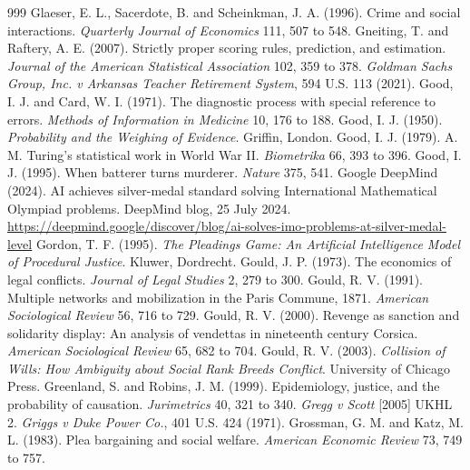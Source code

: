 \begin{thebibliography}{999}
 Glaeser, E. L., Sacerdote, B. and Scheinkman, J. A. (1996). Crime and social interactions. \emph{Quarterly Journal of Economics} 111, 507 to 548.
 Gneiting, T. and Raftery, A. E. (2007). Strictly proper scoring rules, prediction, and estimation. \emph{Journal of the American Statistical Association} 102, 359 to 378.
 \emph{Goldman Sachs Group, Inc. v Arkansas Teacher Retirement System}, 594 U.S. 113 (2021).
 Good, I. J. and Card, W. I. (1971). The diagnostic process with special reference to errors. \emph{Methods of Information in Medicine} 10, 176 to 188.
 Good, I. J. (1950). \emph{Probability and the Weighing of Evidence}. Griffin, London.
 Good, I. J. (1979). A. M. Turing's statistical work in World War II. \emph{Biometrika} 66, 393 to 396.
 Good, I. J. (1995). When batterer turns murderer. \emph{Nature} 375, 541.
 Google DeepMind (2024). AI achieves silver-medal standard solving International Mathematical Olympiad problems. DeepMind blog, 25 July 2024. \url{https://deepmind.google/discover/blog/ai-solves-imo-problems-at-silver-medal-level}
 Gordon, T. F. (1995). \emph{The Pleadings Game: An Artificial Intelligence Model of Procedural Justice}. Kluwer, Dordrecht.
 Gould, J. P. (1973). The economics of legal conflicts. \emph{Journal of Legal Studies} 2, 279 to 300.
 Gould, R. V. (1991). Multiple networks and mobilization in the Paris Commune, 1871. \emph{American Sociological Review} 56, 716 to 729.
 Gould, R. V. (2000). Revenge as sanction and solidarity display: An analysis of vendettas in nineteenth century Corsica. \emph{American Sociological Review} 65, 682 to 704.
 Gould, R. V. (2003). \emph{Collision of Wills: How Ambiguity about Social Rank Breeds Conflict}. University of Chicago Press.
 Greenland, S. and Robins, J. M. (1999). Epidemiology, justice, and the probability of causation. \emph{Jurimetrics} 40, 321 to 340.
 \emph{Gregg v Scott} [2005] UKHL 2.
 \emph{Griggs v Duke Power Co.}, 401 U.S. 424 (1971).
 Grossman, G. M. and Katz, M. L. (1983). Plea bargaining and social welfare. \emph{American Economic Review} 73, 749 to 757.

\end{thebibliography}
